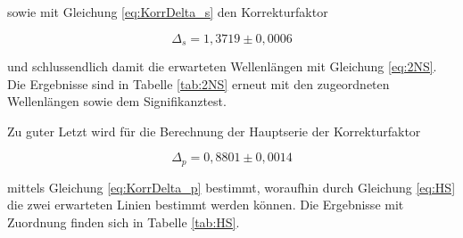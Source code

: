 \documentclass{article}
\begin{document}
sowie mit Gleichung \ref{eq:KorrDelta_s} den Korrekturfaktor

\begin{equation}
    \Delta_s = 1,3719 \pm 0,0006
\end{equation}

und schlussendlich damit die erwarteten Wellenlängen mit Gleichung \ref{eq:2NS}. Die Ergebnisse sind in Tabelle \ref{tab:2NS} erneut mit den zugeordneten Wellenlängen sowie dem Signifikanztest.

\phantom{.}

\begin{table}[!h]
    \centering
    \caption{Zugeornete Linien der 2. Nebenserie}
    \label{tab:2NS}
\end{table}

\phantom{.}
\newpage

Zu guter Letzt wird für die Berechnung der Hauptserie der Korrekturfaktor

\begin{equation}
    \Delta_p = 0,8801 \pm 0,0014
\end{equation}

mittels Gleichung \ref{eq:KorrDelta_p} bestimmt, woraufhin durch Gleichung \ref{eq:HS} die zwei erwarteten Linien bestimmt werden können. Die Ergebnisse mit Zuordnung finden sich in Tabelle \ref{tab:HS}.

\phantom{.}

\begin{table}[!h]
    \centering
    \caption{Zugeornete Linien der Hauptserie}
    \label{tab:HS}
\end{table}
\end{document}
